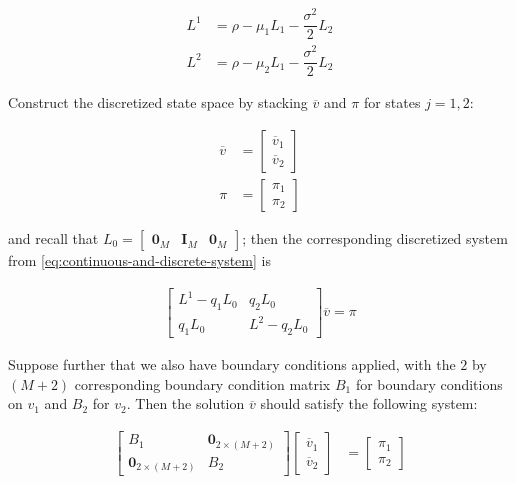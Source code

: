 \documentclass[11pt]{article}
\theoremstyle{definition}
\begin{document}
\begin{align}
{L}^1 &= \rho - \mu_1 L_1 - \dfrac{\sigma^2}{2} L_2 \\
{L}^2 &= \rho - \mu_2 L_1 - \dfrac{\sigma^2}{2} L_2
\end{align}


Construct the discretized state space by stacking $\overline{v}$ and ${\pi}$ for states $j= 1, 2$:

\begin{align}
\overline{v} &= \begin{bmatrix}
\overline{v}_1 \\
\overline{v}_2
\end{bmatrix} \\
\pi &= \begin{bmatrix}
\pi_1\\
\pi_2
\end{bmatrix}
\end{align}

and recall that $L_0 = \begin{bmatrix} \mathbf{0}_M &  \mathbf{I}_M & \mathbf{0}_M  \end{bmatrix} $; then the corresponding discretized system from \eqref{eq:continuous-and-discrete-system} is

\begin{align}
\begin{bmatrix}
{L}^1 - q_1 L_0 & q_2 L_0 \\ 
q_1 L_0 & {L}^2 - q_2 L_0
\end{bmatrix}
\overline{v}
=
\pi
\label{eq:continuous-and-discrete-system-discrete} 
\end{align}

Suppose further that we also have boundary conditions applied, with the $2$ by $(M+2)$ corresponding boundary condition matrix $B_1$ for boundary conditions on $v_1$ and $B_2$ for $v_2$. Then the solution $\overline{v}$ should satisfy the following system:

\begin{align}
\begin{bmatrix}
B_1 & \mathbf{0}_{2 \times (M+2)} \\
\mathbf{0}_{2 \times (M+2)} & B_2 
\end{bmatrix}
\begin{bmatrix}
\overline{v}_1 \\
\overline{v}_2
\end{bmatrix} &= 
\begin{bmatrix}
\pi_1\\
\pi_2
\end{bmatrix} 
\end{align}
\end{document}

